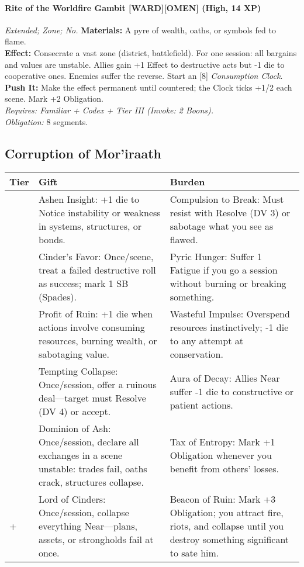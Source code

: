 \paragraph{Rite of the Worldfire Gambit \textnormal{[WARD][OMEN]} (High, 14 XP)} \emph{Extended; Zone; No.}  
\textbf{Materials:} A pyre of wealth, oaths, or symbols fed to flame.\\
\textbf{Effect:} Consecrate a vast zone (district, battlefield). For one session: all bargains and values are unstable. Allies gain +1 Effect to destructive acts but -1 die to cooperative ones. Enemies suffer the reverse. Start an [8] \emph{Consumption Clock}.\\
\textbf{Push It:} Make the effect permanent until countered; the Clock ticks +1/2 each scene. Mark +2 Obligation.\\
\emph{Requires: Familiar + Codex + Tier III (\textit{Invoke:} 2 Boons).}\\
\emph{Obligation:} 8 segments.


\subsection*{Corruption of Mor’iraath}
\label{sec:moriraath-corruption}

\begin{longtable}{>{\raggedright\arraybackslash}p{1cm} p{5cm} p{5cm}}
\toprule
\textbf{Tier} & \textbf{Gift} & \textbf{Burden} \\
\midrule
1 & Ashen Insight: +1 die to Notice instability or weakness in systems, structures, or bonds. & Compulsion to Break: Must resist with Resolve (DV 3) or sabotage what you see as flawed. \\
\midrule
2 & Cinder’s Favor: Once/scene, treat a failed destructive roll as success; mark 1 SB (Spades). & Pyric Hunger: Suffer 1 Fatigue if you go a session without burning or breaking something. \\
\midrule
3 & Profit of Ruin: +1 die when actions involve consuming resources, burning wealth, or sabotaging value. & Wasteful Impulse: Overspend resources instinctively; -1 die to any attempt at conservation. \\
\midrule
4 & Tempting Collapse: Once/session, offer a ruinous deal—target must Resolve (DV 4) or accept. & Aura of Decay: Allies Near suffer -1 die to constructive or patient actions. \\
\midrule
5 & Dominion of Ash: Once/session, declare all exchanges in a scene unstable: trades fail, oaths crack, structures collapse. & Tax of Entropy: Mark +1 Obligation whenever you benefit from others’ losses. \\
\midrule
6+ & Lord of Cinders: Once/session, collapse everything Near—plans, assets, or strongholds fail at once. & Beacon of Ruin: Mark +3 Obligation; you attract fire, riots, and collapse until you destroy something significant to sate him. \\
\bottomrule
\end{longtable}